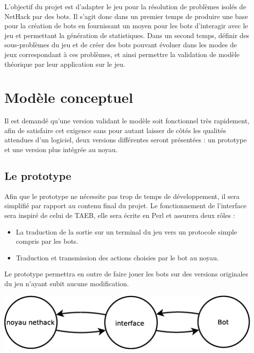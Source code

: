 \documentclass[12pt]{article}
\begin{document}
L'objectif du projet est d'adapter le jeu pour la résolution de problèmes
isolés de NetHack par des bots. Il s'agit donc dans un premier temps de produire une base pour la
création de bots en fournissant un moyen pour les bots d'interagir avec le jeu
et permettant la génération de statistiques. Dans un second temps, définir des sous-problèmes du jeu et de créer des bots pouvant évoluer dans les modes de jeux correspondant à ces problèmes, et ainsi permettre la validation de modèle théorique par leur application sur le jeu.


\section{Modèle conceptuel}

Il est demandé qu'une version validant le modèle soit fonctionnel très rapidement, afin de satisfaire cet exigence sans pour autant laisser de côtés les qualités attendues d'un logiciel, deux versions différentes seront présentées : un prototype et une version plus intégrée au noyau.

\subsection{Le prototype}
Afin que le prototype ne nécessite pas trop de temps de développement, il sera simplifié par rapport au contenu final du projet. Le fonctionnement de l'interface sera inspiré de celui de TAEB, elle sera écrite en Perl et assurera deux rôles :
\begin{itemize}
\item La traduction de la sortie sur un terminal du jeu vers un protocole
simple compris par les bots.
\item Traduction et transmission des actions choisies par le bot au noyau.
\end{itemize}
Le prototype permettra en outre de faire jouer les bots sur des versions
originales du jeu n'ayant subit aucune modification.

\begin{center}
  \includegraphics[width=180mm]{diagrammes/proto_archi.eps}
\end{center}
\end{document}
